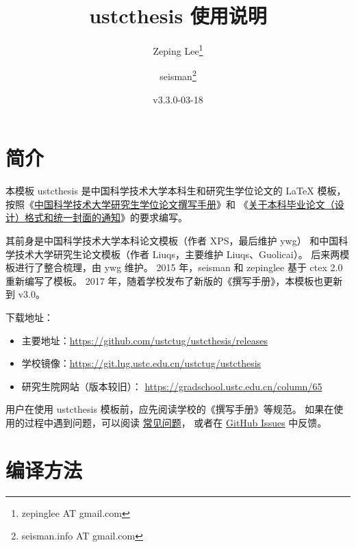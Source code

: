 \documentclass[a4paper]{ltxdoc}
\DeclareRobustCommand\pkg{\textsf}
\DeclareRobustCommand\cls{\textsf}
\begin{document}
\title{\cls{ustcthesis} 使用说明}
\author{Zeping Lee\thanks{zepinglee AT gmail.com} \and
        seisman\thanks{seisman.info AT gmail.com} }
\date{v3.3.0-03-18}
\maketitle



\section{简介}

本模板 \cls{ustcthesis} 是中国科学技术大学本科生和研究生学位论文的 \LaTeX{}
模板， 按照《\href{http://gradschool.ustc.edu.cn/static/oldsite/ylb/material/xw/wdxz/32.pdf}
{中国科学技术大学研究生学位论文撰写手册}》和
《\href{https://www.teach.ustc.edu.cn/notice/notice-teaching/11530.html}
{关于本科毕业论文（设计）格式和统一封面的通知}》的要求编写。

其前身是中国科学技术大学本科论文模板（作者 XPS，最后维护 ywg）
和中国科学技术大学研究生论文模板（作者 Liuqs，主要维护 Liuqs、Guolicai）。
后来两模板进行了整合梳理，由 ywg 维护。
2015 年，seisman 和 zepinglee 基于 \pkg{ctex} 2.0 重新编写了模板。
2017 年，随着学校发布了新版的《撰写手册》，本模板也更新到 v3.0。

下载地址：
\begin{itemize}
  \item 主要地址：\url{https://github.com/ustctug/ustcthesis/releases}
  \item 学校镜像：\url{https://git.lug.ustc.edu.cn/ustctug/ustcthesis}
  \item 研究生院网站（版本较旧）：
    \url{https://gradschool.ustc.edu.cn/column/65}
\end{itemize}

用户在使用 \pkg{ustcthesis} 模板前，应先阅读学校的《撰写手册》等规范。
如果在使用的过程中遇到问题，可以阅读
\href{https://github.com/ustctug/ustcthesis/wiki}{常见问题}，
或者在 \href{https://github.com/ustctug/ustcthesis/issues}{GitHub Issues}
中反馈。



\section{编译方法}
\end{document}
